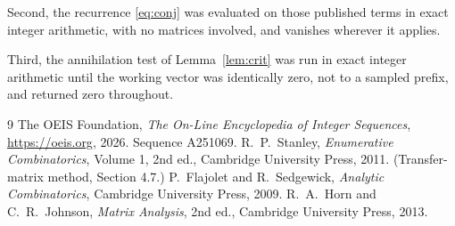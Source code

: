 \documentclass[11pt,a4paper]{article}
\theoremstyle{plain}
\theoremstyle{definition}
\begin{document}
Second, the recurrence \eqref{eq:conj} was evaluated on those published terms in exact
integer arithmetic, with no matrices involved, and vanishes wherever it applies.

Third, the annihilation test of Lemma~\ref{lem:crit} was run in exact integer arithmetic
until the working vector was identically zero, not to a sampled prefix, and returned zero
throughout.

\begin{thebibliography}{9}
 The OEIS Foundation, \emph{The On-Line Encyclopedia of Integer
Sequences}, \url{https://oeis.org}, 2026. Sequence A251069.
 R.~P.~Stanley, \emph{Enumerative Combinatorics}, Volume 1, 2nd ed.,
Cambridge University Press, 2011. (Transfer-matrix method, Section 4.7.)
 P.~Flajolet and R.~Sedgewick, \emph{Analytic Combinatorics}, Cambridge
University Press, 2009.
 R.~A.~Horn and C.~R.~Johnson, \emph{Matrix Analysis}, 2nd ed., Cambridge
University Press, 2013.
\end{thebibliography}
\end{document}
